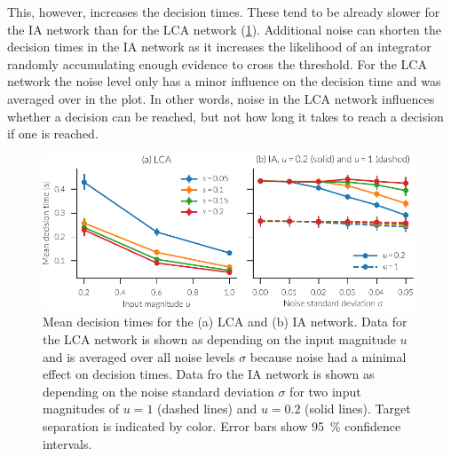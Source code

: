 This, however, increases the decision times.
These tend to be already slower for the IA network than for the LCA network (\cref{fig:ia-time}).
Additional noise can shorten the decision times in the IA network as it increases the likelihood of an integrator randomly accumulating enough evidence to cross the threshold.
For the LCA network the noise level only has a minor influence on the decision time and was averaged over in the plot.
In other words, noise in the LCA network influences whether a decision can be reached, but not how long it takes to reach a decision if one is reached.
\begin{figure}
    \centering
    \includegraphics{figures/ia-time}
    \caption[Mean WTA decisions times]{Mean decision times for the (a) LCA and (b) IA network. Data for the LCA network is shown as depending on the input magnitude $u$ and is averaged over all noise levels $\sigma$ because noise had a minimal effect on decision times. Data fro the IA network is shown as depending on the noise standard deviation $\sigma$ for two input magnitudes of $u = 1$ (dashed lines) and $u = 0.2$ (solid lines). Target separation is indicated by color. Error bars show \SI{95}{\percent} confidence intervals.}\label{fig:ia-time}
\end{figure}

